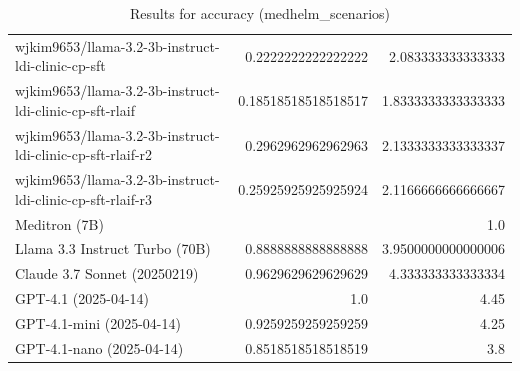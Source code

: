 \begin{table}[htp]
{\begin{tabular}{lrr}
wjkim9653/llama-3.2-3b-instruct-ldi-clinic-cp-sft & 0.2222222222222222 & 2.083333333333333 \\
wjkim9653/llama-3.2-3b-instruct-ldi-clinic-cp-sft-rlaif & 0.18518518518518517 & 1.8333333333333333 \\
wjkim9653/llama-3.2-3b-instruct-ldi-clinic-cp-sft-rlaif-r2 & 0.2962962962962963 & 2.1333333333333337 \\
wjkim9653/llama-3.2-3b-instruct-ldi-clinic-cp-sft-rlaif-r3 & 0.25925925925925924 & 2.1166666666666667 \\
Meditron (7B) &  & 1.0 \\
Llama 3.3 Instruct Turbo (70B) & 0.8888888888888888 & 3.9500000000000006 \\
Claude 3.7 Sonnet (20250219) & 0.9629629629629629 & 4.333333333333334 \\
GPT-4.1 (2025-04-14) & 1.0 & 4.45 \\
GPT-4.1-mini (2025-04-14) & 0.9259259259259259 & 4.25 \\
GPT-4.1-nano (2025-04-14) & 0.8518518518518519 & 3.8 \\
\bottomrule
\end{tabular}}
\caption{Results for accuracy (medhelm_scenarios)}
\label{fig:accuracy (medhelm_scenarios)}
\end{table}